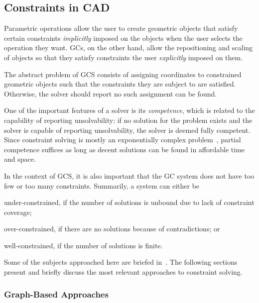 \subsection{Constraints in CAD}%
\label{sec:intro.constraints}

Parametric operations allow the user to create geometric objects that satisfy
certain constraints \emph{implicitly} imposed on the objects when the user
selects the operation they want.  \Acp{GC}, on the other hand, allow the
repositioning and scaling of objects so that they satisfy constraints the user
\emph{explicitly} imposed on them.

The abstract problem of \ac{GCS} consists of assigning coordinates to
constrained geometric objects such that the constraints they are subject to are
satisfied.  Otherwise, the solver should report no such assignment can be found.

One of the important features of a solver is its \emph{competence}, which is
related to the capability of reporting unsolvability: if no solution for the
problem exists and the solver is capable of reporting unsolvability, the solver
is deemed fully competent.  Since constraint solving is mostly an exponentially
complex problem~\cite{Rossi:2006:Handbook}, partial competence suffices as long
as decent solutions can be found in affordable time and space.

In the context of \ac{GCS}, it is also important that the \ac{GC} system does
not have too few or too many constraints.  Summarily, a system can either be 
\begin{enumerate*}[label= (\arabic*)]
  \item under-constrained, if the number of solutions is unbound due to lack of
  constraint coverage;
  \item over-constrained, if there are no solutions because of contradictions;
  or
  \item well-constrained, if the number of solutions is finite.
\end{enumerate*}

Some of the subjects approached here are briefed in~\cite{Hoffmann:2005:BCS}.
The following sections present and briefly discuss the most relevant approaches
to constraint solving.

\subsubsection{Graph-Based Approaches}%
\label{sec:intro.constraints.graph}

